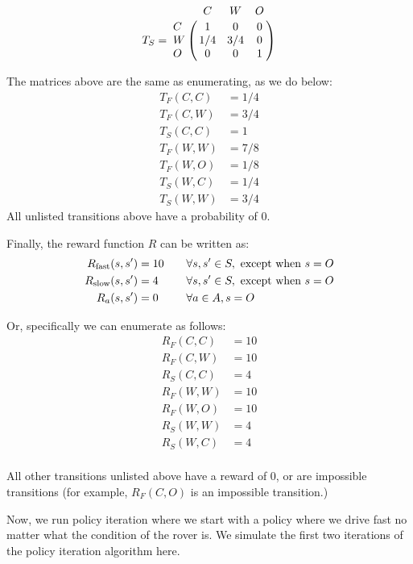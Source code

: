 \documentclass[12pt]{article}
\begin{document}
\begin{equation*}
T_{S} = 
\bordermatrix{&C&W&O\cr
                C & 1 & 0 & 0\cr
                W & 1/4 & 3/4 & 0\cr
                O & 0 & 0 & 1\cr}
\end{equation*}

The matrices above are the same as enumerating, as we do below:
\begin{align*}
T_{F}(C, C) &= 1/4\\
T_{F}(C, W) &= 3/4\\
T_{S}(C, C) &= 1\\
T_{F}(W, W) &= 7/8\\
T_{F}(W, O) &= 1/8\\
T_{S}(W, C) &= 1/4\\
T_{S}(W, W) &= 3/4
\end{align*}
All unlisted transitions above have a probability of $0$.

Finally, the reward function $R$ can be written as:
\begin{align*}
R_{\textrm{fast}}(s, s') &= 10 \hspace{2em}\forall s, s'\in S, \textrm{ except when } s = O\\
R_{\textrm{slow}}(s, s') &= 4  \hspace{2.5em}\forall s, s'\in S, \textrm{ except when } s = O\\
R_{a}(s, s') &= 0 \hspace{2.5em} \forall a\in A, s = O
\end{align*}

Or, specifically we can enumerate as follows:
\begin{align*}
R_F(C, C) &= 10\\
R_F(C, W) &= 10\\
R_S(C, C) &= 4\\
R_F(W, W) &= 10\\
R_F(W, O) &= 10\\
R_S(W, W) &= 4\\
R_S(W, C) &= 4\\
\end{align*}

All other transitions unlisted above have a reward of $0$, or are impossible transitions (for example, $R_F(C, O)$ is an impossible transition.)


Now, we run policy iteration where we start with a policy where we drive fast no matter what the condition of the rover is. We simulate the first two iterations of the policy iteration algorithm here.
\end{document}
